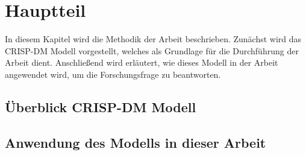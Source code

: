 \newpage

\section{Hauptteil} \label{Methodik}
In diesem Kapitel wird die Methodik der Arbeit beschrieben. Zunächst wird das CRISP-DM Modell vorgestellt, welches als Grundlage für die Durchführung der Arbeit dient. Anschließend wird erläutert, wie dieses Modell in der Arbeit angewendet wird, um die Forschungsfrage zu beantworten.

\subsection{Überblick CRISP-DM Modell} \label{ueberblickcrispdm}


\subsection{Anwendung des Modells in dieser Arbeit} \label{anwendungdesmodellsinderarbeit}

